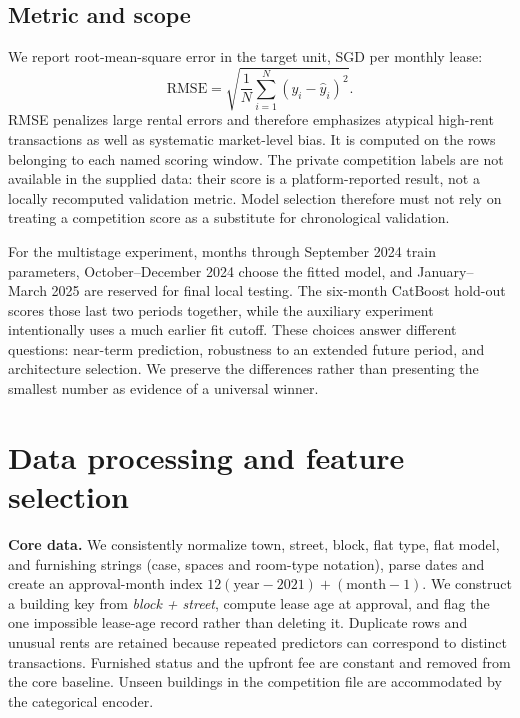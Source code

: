 \documentclass[10pt,a4paper]{article}
\begin{document}
\subsection*{Metric and scope}
We report root-mean-square error in the target unit, SGD per monthly lease:
\begin{equation}\label{eq:rmse} \mathrm{RMSE}=\sqrt{\frac{1}{N}\sum_{i=1}^{N}(y_i-\hat y_i)^2}.\end{equation}
RMSE penalizes large rental errors and therefore emphasizes atypical high-rent transactions as well as systematic market-level bias. It is computed on the rows belonging to each named scoring window. The private competition labels are not available in the supplied data: their score is a platform-reported result, not a locally recomputed validation metric. Model selection therefore must not rely on treating a competition score as a substitute for chronological validation.

For the multistage experiment, months through September 2024 train parameters, October--December 2024 choose the fitted model, and January--March 2025 are reserved for final local testing. The six-month CatBoost hold-out scores those last two periods together, while the auxiliary experiment intentionally uses a much earlier fit cutoff. These choices answer different questions: near-term prediction, robustness to an extended future period, and architecture selection. We preserve the differences rather than presenting the smallest number as evidence of a universal winner.


\section{Data processing and feature selection}\label{sec:process}
\textbf{Core data.} We consistently normalize town, street, block, flat type, flat model, and furnishing strings (case, spaces and room-type notation), parse dates and create an approval-month index $12(\mathrm{year}-2021)+(\mathrm{month}-1)$. We construct a building key from \emph{block + street}, compute lease age at approval, and flag the one impossible lease-age record rather than deleting it. Duplicate rows and unusual rents are retained because repeated predictors can correspond to distinct transactions. Furnished status and the upfront fee are constant and removed from the core baseline. Unseen buildings in the competition file are accommodated by the categorical encoder.
\end{document}
